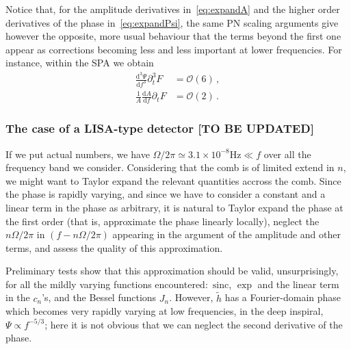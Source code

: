 \documentclass[aps,showpacs,%
prd,superscriptaddress,nofootinbib]{revtex4}
\newcommand\ud{{\mathrm{d}}}
\newcommand\calO{{\mathcal{O}}}
\newcommand{\sinc}{\,\mathrm{sinc}}
\begin{document}
Notice that, for the amplitude derivatives in~\eqref{eq:expandA} and the higher order derivatives of the phase in~\eqref{eq:expandPsi}, the same PN scaling arguments give however the opposite, more usual behaviour that the terms beyond the first one appear as corrections becoming less and less important at lower frequencies. For instance, within the SPA we obtain
%
\begin{subequations}
\begin{align}
	\frac{\ud^{3} \Psi}{\ud f^{3}} \partial_{t}^{3} F &= \calO(6) \,, \\
	\frac{1}{A}\frac{\ud A}{\ud f} \partial_{t} F &= \calO(2) \,.
\end{align}
\end{subequations}
%

\subsubsection{The case of a LISA-type detector [TO BE UPDATED]}
\label{subsubsec:sizecorrLISA}

If we put actual numbers, we have $\Omega/2\pi \simeq 3.1\times10^{-8}\mathrm{Hz} \ll f$ over all the frequency band we consider. Considering that the comb is of limited extend in $n$, we might want to Taylor expand the relevant quantities accross the comb. Since the phase is rapidly varying, and since we have to consider a constant and a linear term in the phase as arbitrary, it is natural to Taylor expand the phase at the first order (that is, approximate the phase linearly locally), neglect the $n\Omega/2\pi$ in $(f-n\Omega/2\pi)$ appearing in the argument of the amplitude and other terms, and assess the quality of this approximation.

Preliminary tests show that this approximation should be valid, unsurprisingly, for all the mildly varying functions encountered: $\sinc$, $\exp$ and the linear term in the $c_{n}$'s, and the Bessel functions $J_{n}$. However, $\tilde{h}$ has a Fourier-domain phase which becomes very rapidly varying at low frequencies, in the deep inspiral, $\Psi\propto f^{-5/3}$; here it is not obvious that we can neglect the second derivative of the phase.
\end{document}
